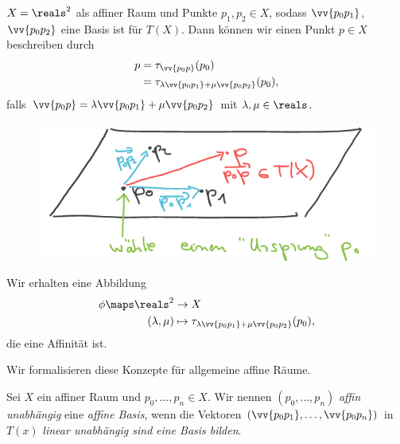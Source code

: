 \begin{bspidee*}
    \( X=\reals^2 \) als affiner Raum und Punkte \( p_1,p_2\in X \), sodass \( \vv{p_0p_1} \), \( \vv{p_0p_2} \) eine Basis ist für \( T(X) \). Dann können wir einen Punkt \( p\in X \) beschreiben durch
    \begin{align*}
        p \begin{aligned}[t]
            &=\tau_{\vv{p_0p}}(p_0)\\
            &=\tau_{\lambda\vv{p_0p_1}+\mu\vv{p_0p_2}}(p_0),
        \end{aligned}
    \end{align*}
    falls \( \vv{p_0p}=\lambda\vv{p_0p_1}+\mu\vv{p_0p_2} \) mit \( \lambda,\mu\in \reals \).

    \begin{figure}[H]
        \centering
        \includegraphics[width=0.5\linewidth]{figures/ursprungswahl}
        \label{fig:ursprungswahl}
    \end{figure}
    
    Wir erhalten eine Abbildung 
    \begin{align*}
        \phi\maps \begin{aligned}[t]
            \reals^2&\to X\\
            (\lambda,\mu)&\mapsto \tau_{\lambda\vv{p_0 p_1}+\mu\vv{p_0 p_2}}(p_0),
        \end{aligned}
    \end{align*}
    die eine Affinität ist.
\end{bspidee*}
Wir formalisieren diese Konzepte für allgemeine affine Räume.
\begin{definition*}
    Sei \( X \) ein affiner Raum und \( p_0,\dotsc, p_n\in X \). Wir nennen \( (p_0,\dotsc,p_n) \) \emph{affin unabhängig} \bzw eine \emph{affine Basis}, wenn die Vektoren \( (\vv{p_0p_1},\dotsc, \vv{p_0p_n}) \) in \( T(x) \) \emph{linear unabhängig sind} \bzw \emph{eine Basis bilden}.
\end{definition*}
